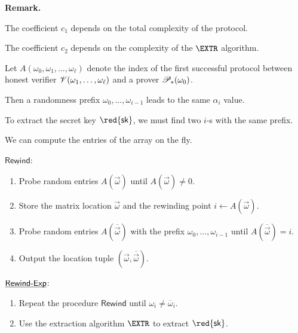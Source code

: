 \documentclass[landscape,footrule]{foils}
\renewcommand{\SK}{{\red{\mathsf{sk}}}}
\begin{document}
\textbf{Remark.} 
\begin{triangles}
\item The coefficient $c_1$ depends on the total complexity of the protocol.
\item The coefficient $c_2$ depends on the complexity of the $\EXTR$
  algorithm.
\end{triangles}



Let $A(\omega_0,\omega_1,\ldots,\omega_\ell)$ denote the index of the
first successful protocol between honest verifier
$\mathscr{V}(\omega_{1},\ldots,\omega_\ell)$ and a prover
$\mathscr{P}_*(\omega_0)$.
\begin{triangles}
\item Then a randomness prefix $\omega_0,\ldots,\omega_{i-1}$ leads to the same $\alpha_i$ value.
\item To extract the secret key $\SK$, we must find two $i$-s with the same prefix.
\item We can compute the entries of the array on the fly.
\end{triangles}





$\underline{\mathsf{Rewind}}$:
\begin{enumerate}
 \item Probe random entries $A(\vec{\omega})$ until $A(\vec{\omega})\neq 0$.
 \item Store the matrix location $\vec{\omega}$ and the rewinding point $i\gets A(\vec{\omega})$.
 \item Probe random entries $A(\overline{\vec{\omega}})$ with the prefix $\omega_0,\ldots,\omega_{i-1}$ until $A(\overline{\vec{\omega}})=i$.
 \item Output the location tuple $(\vec{\omega},\overline{\vec{\omega}})$.
\end{enumerate}
\Bigskip

$\underline{\smash{\mathsf{Rewind\text{-}Exp}}}$:
\begin{enumerate}
  \item Repeat the procedure $\mathsf{Rewind}$ until $\omega_i\neq\overline{\omega}_i$.
  \item Use the extraction algorithm $\EXTR$ to extract $\SK$.
\end{enumerate}
\end{document}
